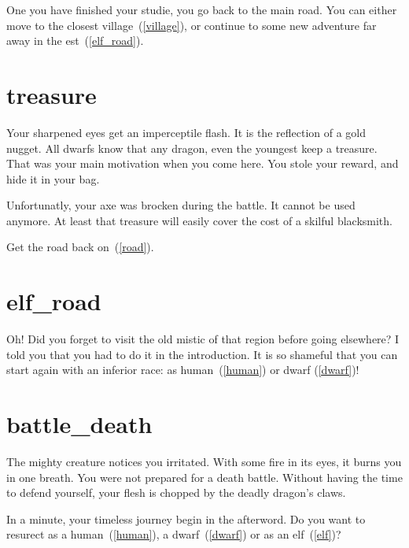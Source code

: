 One you have finished your studie, you go back to the main road. You can either
move to the closest village~(\ref{village}), or continue to some new adventure
far away in the est~(\ref{elf_road}).

\section{treasure}

Your sharpened eyes get an imperceptile flash. It is the reflection of a gold
nugget. All dwarfs know that any dragon, even the youngest keep a treasure. That
was your main motivation when you come here. You stole your reward, and hide it
in your bag.

Unfortunatly, your axe was brocken during the battle. It cannot be used anymore.
At least that treasure will easily cover the cost of a skilful blacksmith.

Get the road back on~(\ref{road}).


\section{elf_road}

Oh! Did you forget to visit the old mistic of that region before going
elsewhere? I told you that you had to do it in the introduction. It is so
shameful that you can start again with an inferior race: as human~(\ref{human})
or dwarf (\ref{dwarf})!

\section{battle_death}

The mighty creature notices you irritated. With some fire in its eyes, it burns
you in one breath. You were not prepared for a death battle. Without having the
time to defend yourself, your flesh is chopped by the deadly dragon's claws.

\medbreak

In a minute, your timeless journey begin in the afterword. Do you want to resurect
as a human~(\ref{human}), a dwarf~(\ref{dwarf}) or as an elf~(\ref{elf})?
